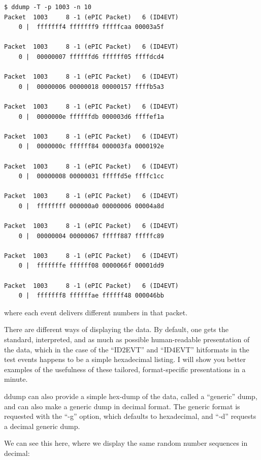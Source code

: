 \documentclass{article}[11pt]
\begin{document}
\begin{verbatim}
$ ddump -T -p 1003 -n 10
Packet  1003     8 -1 (ePIC Packet)   6 (ID4EVT)
    0 |  fffffff4 fffffff9 fffffcaa 00003a5f

Packet  1003     8 -1 (ePIC Packet)   6 (ID4EVT)
    0 |  00000007 ffffffd6 ffffff05 ffffdcd4

Packet  1003     8 -1 (ePIC Packet)   6 (ID4EVT)
    0 |  00000006 00000018 00000157 ffffb5a3

Packet  1003     8 -1 (ePIC Packet)   6 (ID4EVT)
    0 |  0000000e ffffffdb 000003d6 ffffef1a

Packet  1003     8 -1 (ePIC Packet)   6 (ID4EVT)
    0 |  0000000c ffffff84 000003fa 0000192e

Packet  1003     8 -1 (ePIC Packet)   6 (ID4EVT)
    0 |  00000008 00000031 fffffd5e ffffc1cc

Packet  1003     8 -1 (ePIC Packet)   6 (ID4EVT)
    0 |  ffffffff 000000a0 00000006 00004a8d

Packet  1003     8 -1 (ePIC Packet)   6 (ID4EVT)
    0 |  00000004 00000067 fffff887 fffffc89

Packet  1003     8 -1 (ePIC Packet)   6 (ID4EVT)
    0 |  fffffffe ffffff08 0000066f 00001dd9

Packet  1003     8 -1 (ePIC Packet)   6 (ID4EVT)
    0 |  fffffff8 ffffffae ffffff48 000046bb
\end{verbatim}

where each event delivers different numbers in that packet.


There are different ways of displaying the data. By default, one gets
the standard, interpreted, and as much as possible human-readable
presentation of the data, which in the case of the ``ID2EVT'' and
``ID4EVT'' hitformats in the test events happens to be a simple
hexadecimal listing. I will show you better examples of the usefulness
of these tailored, format-specific presentations in a minute.

ddump can also provide a simple hex-dump of the data, called a
``generic'' dump, and can also make a generic dump in decimal
format. The generic format is requested with the ``-g'' option, which
defaults to hexadecimal, and ``-d'' requests a decimal generic dump.

We can see this here, where we display the same random number
sequences in decimal:
\end{document}
